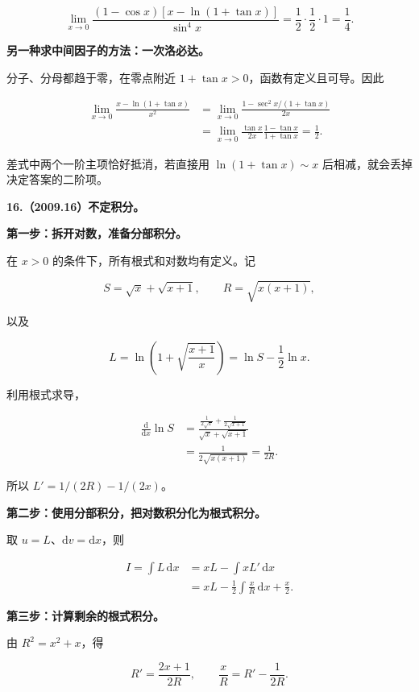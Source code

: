 \documentclass[UTF8,11pt,fontset=windows]{ctexart}
\begin{document}
$$
\boxed{\lim_{x\to0}\frac{(1-\cos x)[x-\ln(1+\tan x)]}{\sin^4x}
=\frac12\cdot\frac12\cdot1=\frac14}.
$$

\textbf{另一种求中间因子的方法：一次洛必达。}

分子、分母都趋于零，在零点附近 $1+\tan x>0$，函数有定义且可导。因此

$$
\begin{aligned}
\lim_{x\to0}\frac{x-\ln(1+\tan x)}{x^2}
&=\lim_{x\to0}\frac{1-\sec^2x/(1+\tan x)}{2x}\\
&=\lim_{x\to0}\frac{\tan x}{2x}
\frac{1-\tan x}{1+\tan x}
=\frac12.
\end{aligned}
$$

差式中两个一阶主项恰好抵消，若直接用 $\ln(1+\tan x)\sim x$ 后相减，就会丢掉决定答案的二阶项。

\clearpage

\textbf{16.（2009.16）不定积分。}

\textbf{第一步：拆开对数，准备分部积分。}

在 $x>0$ 的条件下，所有根式和对数均有定义。记

$$
S=\sqrt{x}+\sqrt{x+1},\qquad R=\sqrt{x(x+1)},
$$

以及

$$
L=\ln\left(1+\sqrt{\frac{x+1}{x}}\right)
=\ln S-\frac12\ln x.
$$

利用根式求导，

$$
\begin{aligned}
\frac{\mathrm d}{\mathrm dx}\ln S
&=\frac{\frac1{2\sqrt{x}}+\frac1{2\sqrt{x+1}}}
{\sqrt{x}+\sqrt{x+1}}\\
&=\frac1{2\sqrt{x(x+1)}}=\frac1{2R}.
\end{aligned}
$$

所以 $L'=1/(2R)-1/(2x)$。

\textbf{第二步：使用分部积分，把对数积分化为根式积分。}

取 $u=L$、$\mathrm dv=\mathrm dx$，则

$$
\begin{aligned}
I=\int L\,\mathrm dx
&=xL-\int xL'\,\mathrm dx\\
&=xL-\frac12\int\frac{x}{R}\,\mathrm dx+\frac x2.
\end{aligned}
$$

\textbf{第三步：计算剩余的根式积分。}

由 $R^2=x^2+x$，得

$$
R'=\frac{2x+1}{2R},
\qquad \frac{x}{R}=R'-\frac1{2R}.
$$
\end{document}
